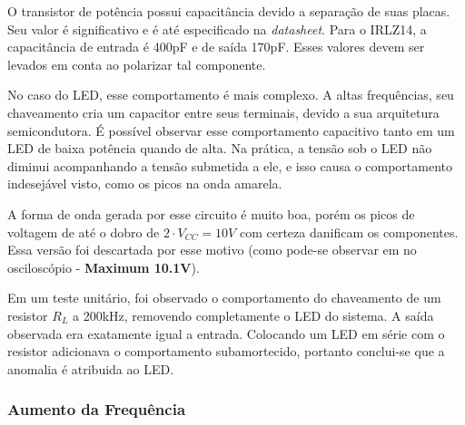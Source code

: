 	O transistor de potência possui capacitância devido a separação de suas placas. Seu valor é significativo e é até especificado na \textit{datasheet}. Para o IRLZ14, a capacitância de entrada é 400pF e de saída 170pF. Esses valores devem ser levados em conta ao polarizar tal componente. 

	No caso do LED, esse comportamento é mais complexo. A altas frequências, seu chaveamento cria um capacitor entre seus terminais, devido a sua arquitetura semicondutora. É possível observar esse comportamento capacitivo tanto em um LED de baixa potência quando de alta. Na prática, a tensão sob o LED não diminui acompanhando a tensão submetida a ele, e isso causa o comportamento indesejável visto, como os picos na onda amarela.
	
	A forma de onda gerada por esse circuito é muito boa, porém os picos de voltagem de até o dobro de $2 \cdot V_{CC} = 10V$ com certeza danificam os componentes. Essa versão foi descartada por esse motivo (como pode-se observar em no osciloscópio - \textbf{Maximum 10.1V}). 
	
	Em um teste unitário, foi observado o comportamento do chaveamento de um resistor $R_{L}$ a 200kHz, removendo completamente o LED do sistema. A saída observada era exatamente igual a entrada. Colocando um LED em série com o resistor adicionava o comportamento subamortecido, portanto conclui-se que a anomalia é atribuida ao LED.
	
	\subsubsection{Aumento da Frequência}

